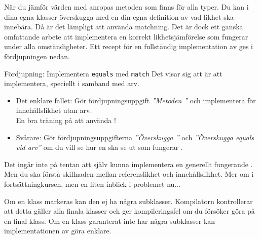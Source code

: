 


\ifkompendium
\noindent När du jämför värden med \code{==} anropas metoden  som finns för alla typer. Du kan i dina egna klasser överskugga  med en din egna definition av vad likhet ska innebära. Då är det lämpligt att använda matchning. Det är dock ett ganska omfattande arbete att implementera en korrekt likhetsjämförelse som fungerar under alla omständigheter. Ett recept för en fullständig implementation av  ges i fördjupningen nedan. 
\fi

\begin{Slide}{Fördjupning: Implementera \texttt{equals} med \texttt{match}}
Det visar sig att  är  att implementera, speciellt  i samband med arv.
\begin{itemize}\SlideFontSmall
\item Det enklare fallet: Gör fördjupningsuppgift \textit{''Metoden ''} och implementera  för innehållslikhet utan arv. \\ En bra träning på att använda !

\item Svårare: Gör fördjupningsuppgifterna  \textit{''Överskugga ''} och \textit{''Överskugga equals vid arv''} om du vill se hur en   ska se ut som fungerar .

\end{itemize}

\noindent Det ingår inte på tentan att själv kunna implementera en generellt fungerande . Men du ska förstå skillnaden mellan referenslikhet och innehållslikhet. Mer om  i fortsättningkursen, men en liten inblick i problemet nu...
\end{Slide}

\ifkompendium
\noindent Om en klass markeras  kan den ej ha några subklasser. Kompilatorn kontrollerar att detta gäller alla finala klasser och ger kompileringsfel om du försöker göra  på en final klass. Om en klass garanterat inte har några subklasser kan implementationen av  göra enklare.
\fi 

